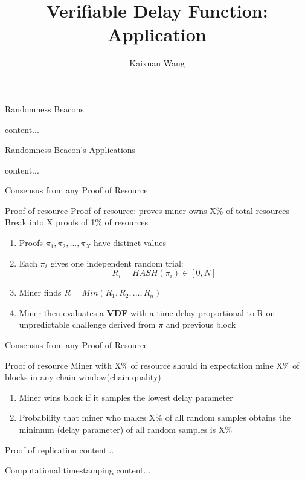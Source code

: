 \documentclass[UTF8]{beamer}
\title{Verifiable Delay Function: Application}
\author{Kaixuan Wang}
\institute[SJTU]{Shanghai Jiao Tong University}
\begin{document}
	\begin{frame}
		\titlepage
	\end{frame}
	\begin{frame}{Randomness Beacons}
		\begin{block}{}
			content...
		\end{block}
	\end{frame}

	\begin{frame}{Randomness Beacon's Applications}
		\begin{block}{}
			content...
		\end{block}
	\end{frame}

	\begin{frame}{Consensus from any Proof of Resource}
		\begin{block}{Proof of resource}
			Proof of resource: proves miner owns X\% of total resources\\
			Break into X proofs of 1\% of resources
			\begin{enumerate}
				\item Proofs ${\pi}_1,{\pi}_2,...,{\pi}_X$ have distinct values
				\item Each ${\pi}_i$ gives one independent random trial:$$R_i = HASH\left({\pi}_i\right) \in \left[0,N\right]$$
				\item Miner finds $R = Min\left( R_1,R_2,...,R_n\right)$
				\item Miner then evaluates a\textbf{ VDF} with a time delay proportional to R on unpredictable challenge derived from $\pi$ and previous block
			\end{enumerate}
		\end{block}
	\end{frame}

	\begin{frame}{Consensus from any Proof of Resource}
		\begin{block}{Proof of resource}
			Miner with X\% of resource should in expectation mine X\% of blocks in any chain window(chain quality)
			\begin{enumerate}
				\item Miner wins block if it samples the lowest delay parameter
				\item Probability that miner who makes X\% of all random samples obtains the minimum (delay parameter) of all random samples is X\%
			\end{enumerate}
		\end{block}
	\end{frame}
	\begin{frame}{Proof of replication}
		content...
	\end{frame}

	\begin{frame}{Computational timestamping}
		content...
	\end{frame}
	
	
\end{document}

